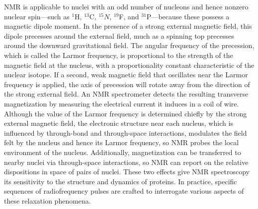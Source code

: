 \documentclass[9pt,review]{livecoms}
\begin{document}
NMR is applicable to nuclei with an odd number of nucleons and hence nonzero nuclear spin---such as $^1$H, $^{13}$C, $^{15}N$, $^{19}$F, and $^{31}$P---because these possess a magnetic dipole moment.
In the presence of a strong external magnetic field, this dipole precesses around the external field, much as a spinning top precesses around the downward gravitational field.
The angular frequency of the precession, which is called the Larmor frequency, is proportional to the strength of the magnetic field at the nucleus, with a proportionality constant characteristic of the nuclear isotope.
If a second, weak magnetic field that oscillates near the Larmor frequency is applied, the axis of precession will rotate away from the direction of the strong external field.
An NMR spectrometer detects the resulting transverse magnetization by measuring the electrical current it induces in a coil of wire.
Although the value of the Larmor frequency is determined chiefly by the strong external magnetic field, the electronic structure near each nucleus, which is influenced by through-bond and through-space interactions, modulates the field felt by the nucleus and hence its Larmor frequency, so NMR probes the local environment of the nucleus.
Additionally, magnetization can be transferred to nearby nuclei via through-space interactions, so NMR can report on the relative dispositions in space of pairs of nuclei.
These two effects give NMR spectroscopy its sensitivity to the structure and dynamics of proteins.
In practice, specific sequences of radiofrequency pulses are crafted to interrogate various aspects of these relaxation phenomena. 
\end{document}
